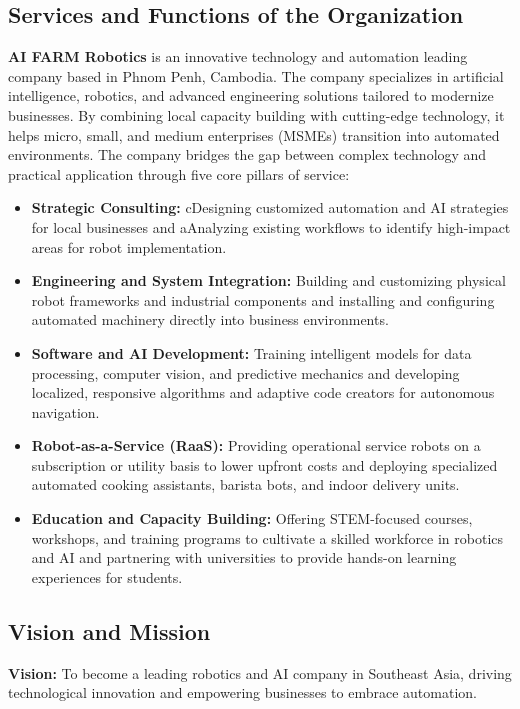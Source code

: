 \subsection{Services and Functions of the Organization}

\textbf{AI FARM Robotics} is an innovative technology and automation leading company based in Phnom Penh, Cambodia. The company specializes in artificial intelligence, robotics, and advanced engineering solutions tailored to modernize businesses. By combining local capacity building with cutting-edge technology, it helps micro, small, and medium enterprises (MSMEs) transition into automated environments. The company bridges the gap between complex technology and practical application through five core pillars of service:

\begin{itemize}
    \item \textbf{Strategic Consulting:} cDesigning customized automation and AI strategies for local businesses and aAnalyzing existing workflows to identify high-impact areas for robot implementation.
    \item \textbf{Engineering and System Integration:} Building and customizing physical robot frameworks and industrial components and installing and configuring automated machinery directly into business environments.
    \item \textbf{Software and AI Development:} Training intelligent models for data processing, computer vision, and predictive mechanics and developing localized, responsive algorithms and adaptive code creators for autonomous navigation.
    \item \textbf{Robot-as-a-Service (RaaS):} Providing operational service robots on a subscription or utility basis to lower upfront costs and deploying specialized automated cooking assistants, barista bots, and indoor delivery units.
    \item \textbf{Education and Capacity Building:} Offering STEM-focused courses, workshops, and training programs to cultivate a skilled workforce in robotics and AI and partnering with universities to provide hands-on learning experiences for students.
\end{itemize}

\subsection{Vision and Mission}

\textbf{Vision:} To become a leading robotics and AI company in Southeast Asia, driving technological innovation and empowering businesses to embrace automation.

